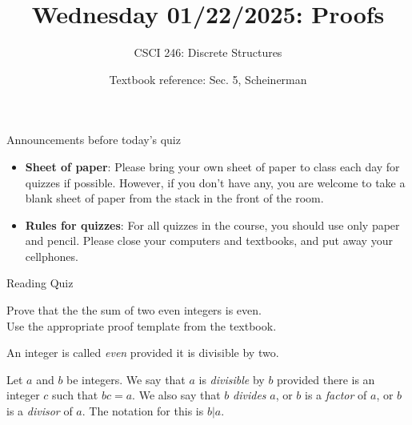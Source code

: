 \documentclass[10pt]{beamer}
\begin{document}






\title{Wednesday 01/22/2025: Proofs}
\author{CSCI 246: Discrete Structures}
\date{Textbook reference: Sec. 5, Scheinerman}

\begin{frame}
    \titlepage 
\end{frame}


\begin{frame}{Announcements before today's quiz}

\begin{itemize}
\item \textbf{Sheet of paper}: Please bring your own sheet of paper to class each day for quizzes if possible. However, if you don't have any, you are welcome to take a blank sheet of paper from the stack in the front of the room.
\item \textbf{Rules for quizzes}: For all quizzes in the course, you should use only paper and pencil.  Please close your computers and textbooks, and put away your cellphones.    
\end{itemize}


\end{frame}


\begin{frame}{Reading Quiz}

\vfill 

 \begin{quiz}[title=Quiz Question]
Prove that the the sum of two even integers is even.\\
Use the appropriate proof template from the textbook. 
\end{quiz}

\pause 


\vfill \vfill 



\begin{mydef}[title=Definition 3.1 (\textbf{Even})]
An integer is called \textit{even} provided it is divisible by two.
\end{mydef}

\begin{mydef}[title=Definition 3.2 (\textbf{Divisible})]
Let $a$ and $b$ be integers.  We say that $a$ is \textit{divisible} by $b$ provided there is an integer $c$ such that $bc=a$.  We also say that $b$ \textit{divides} $a$, or $b$ is a \textit{factor} of $a$, or $b$ is a \textit{divisor} of $a$.  The notation for this is $b|a$. 
\end{mydef}

\end{frame}
\end{document}
